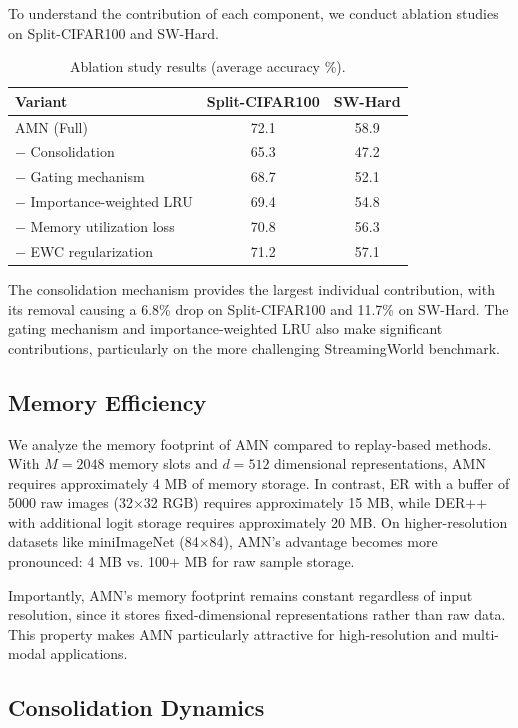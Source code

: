 \documentclass[11pt]{article}
\begin{document}
To understand the contribution of each component, we conduct ablation studies on Split-CIFAR100 and SW-Hard.

\begin{table}[h]
\centering
\caption{Ablation study results (average accuracy \%).}
\label{tab:ablation}
\begin{tabular}{lcc}
\hline
Variant & Split-CIFAR100 & SW-Hard \\
\hline
AMN (Full) & 72.1 & 58.9 \\
$-$ Consolidation & 65.3 & 47.2 \\
$-$ Gating mechanism & 68.7 & 52.1 \\
$-$ Importance-weighted LRU & 69.4 & 54.8 \\
$-$ Memory utilization loss & 70.8 & 56.3 \\
$-$ EWC regularization & 71.2 & 57.1 \\
\hline
\end{tabular}
\end{table}

The consolidation mechanism provides the largest individual contribution, with its removal causing a 6.8\% drop on Split-CIFAR100 and 11.7\% on SW-Hard. The gating mechanism and importance-weighted LRU also make significant contributions, particularly on the more challenging StreamingWorld benchmark.

\subsection{Memory Efficiency}

We analyze the memory footprint of AMN compared to replay-based methods. With $M = 2048$ memory slots and $d = 512$ dimensional representations, AMN requires approximately 4 MB of memory storage. In contrast, ER with a buffer of 5000 raw images (32$\times$32 RGB) requires approximately 15 MB, while DER++ with additional logit storage requires approximately 20 MB. On higher-resolution datasets like miniImageNet (84$\times$84), AMN's advantage becomes more pronounced: 4 MB vs. 100+ MB for raw sample storage.

Importantly, AMN's memory footprint remains constant regardless of input resolution, since it stores fixed-dimensional representations rather than raw data. This property makes AMN particularly attractive for high-resolution and multi-modal applications.

\subsection{Consolidation Dynamics}
\end{document}
